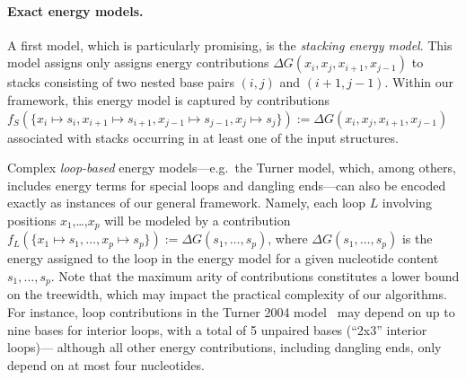 \documentclass[twocolumn]{bmcart}%
\newcommand{\Def}[1]{\emph{#1}}
\newcommand{\citep}[1]{\cite{#1}}
\begin{document}
\paragraph{Exact energy models.}
A first model, which is particularly promising, is the
\Def{stacking energy model}. This model assigns only assigns energy
contributions $\Delta G(x_i,x_j,x_{i+1},x_{j-1})$ to stacks consisting of two nested base pairs $(i,j)$ and $(i+1,j-1)$. Within our framework, this energy model is captured by contributions $f_S(\{x_i\mapsto s_i, x_{i+1}\mapsto s_{i+1}, x_{j-1}\mapsto s_{j-1}, x_{j}\mapsto s_{j}\}):=\Delta G(x_i,x_j,x_{i+1},x_{j-1})$ associated with stacks occurring in at least one of the input structures.

Complex \Def{loop-based}
 energy models---e.g.~the Turner model,
which, among others, includes energy terms for special loops and dangling
ends---can also be encoded exactly as instances of our general framework. Namely, each loop $L$ involving positions $x_1$,\ldots,$x_p$ will be modeled by a contribution $f_L(\{x_1\mapsto s_1,\ldots, x_p\mapsto s_p\}):=\Delta G(s_1,\ldots,s_p)$, where $\Delta G(s_1,\ldots,s_p)$ is the energy assigned to the loop in the energy model for a given nucleotide content $s_1,\ldots,s_p$. Note that the maximum arity of contributions constitutes a lower bound on the treewidth, which may impact the practical complexity of our algorithms. For instance, loop contributions in the Turner 2004 model~\citep{Turner2009} may depend on up to
nine bases for interior loops, with a total of 5 unpaired bases (``2x3'' interior loops)--- although all other energy contributions, including dangling ends, only depend on at most four nucleotides.


\end{document}
